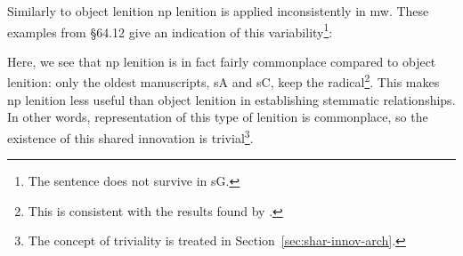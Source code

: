 Similarly to object lenition \gls{np} lenition is applied inconsistently in \gls{mw}. These examples from  \S 64.12 give an indication of this variability\footnote{The sentence does not survive in \gls{sG}.}:
\begin{mwl}
\end{mwl}
Here, we see that \gls{np} lenition is in fact fairly commonplace compared to object lenition: only the oldest manuscripts, \gls{sA} and \gls{sC}, keep the radical\footnote{This is consistent with the results found by \textcite{van_development14}.}. This makes \gls{np} lenition less useful than object lenition in establishing stemmatic relationships. In other words, representation of this type of lenition is commonplace, so the existence of this shared innovation is trivial\footnote{The concept of triviality is treated in Section~\ref{sec:shar-innov-arch}.}.





